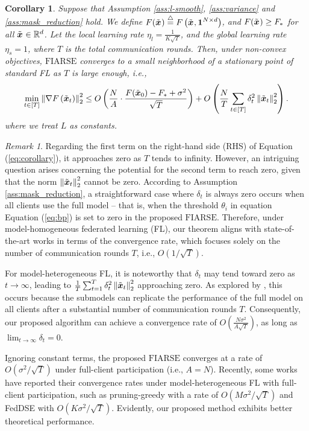 \documentclass{article}
\renewcommand{\cite}{\citep}
\theoremstyle{plain}
\newtheorem{corollary}[theorem]{Corollary}
\theoremstyle{definition}
\theoremstyle{remark}
\newtheorem{remark}[theorem]{Remark}
\newcommand{\algo}{\ensuremath{\text{FIARSE}}\xspace}
\renewcommand{\eqref}[1]{Equation (\ref{#1})}
\newcommand{\defeq}{\overset{\triangle}{=}}
\newcommand{\bracket}[1]{\left(#1\right)}
\newcommand{\norm}[1]{\left\|#1\right\|_2^2}
\begin{document}
\begin{corollary} \label{theorem}
Suppose that Assumption \ref{ass:l-smooth}, \ref{ass:variance} and \ref{ass:mask_reduction} hold. We define $F(\x{}) \defeq F\bracket{\x{}, \boldsymbol{1}^{N \times d}}$, and $F(\x{}) \geq F_*$ for all $\x{} \in \mathbb{R}^d$. Let the local learning rate $\eta_l = \frac{1}{K\sqrt{T}}$, and the global learning rate $\eta_s =1$, where $T$ is the total communication rounds. Then, under non-convex objectives, \algo converges to a small neighborhood of a stationary point of standard FL as $T$ is large enough, i.e., 
\begin{align} \label{eq:corollary}
    \min_{t \in [T]} \norm{\nabla F\bracket{\x{t}}} \leq  O\bracket{\frac{N}{A} \cdot \frac{F(\x{0}) - F_* + \sigma^2}{ \sqrt{T}}} + O\bracket{\frac{N}{T} \sum_{t \in [T]} \delta_t^2 \norm{\x{t}}}. 
\end{align}
where we treat $L$ as constants. 
\end{corollary}

\begin{remark}

Regarding the first term on the right-hand side (RHS) of \eqref{eq:corollary}, it approaches zero as $T$ tends to infinity. However, an intriguing question arises concerning the potential for the second term to reach zero, given that the norm $\norm{\x{t}}$ cannot be zero. According to Assumption \ref{ass:mask_reduction}, a straightforward case where $\delta_t$ is always zero occurs when all clients use the full model -- that is, when the threshold $\theta_i$ in equation \eqref{eq:bp} is set to zero in the proposed \algo. Therefore, under model-homogeneous federated learning (FL), our theorem aligns with state-of-the-art works \cite{karimireddy2020scaffold, yang2020achieving} in terms of the convergence rate, which focuses solely on the number of communication rounds $T$, i.e., $O\bracket{1/\sqrt{T}}$.

For model-heterogeneous FL, it is noteworthy that $\delta_t$ may tend toward zero as $t \rightarrow \infty$, leading to $\frac{1}{T} \sum_{t=1}^{T} \delta_t^2 \norm{\x{t}}$ approaching zero. As explored by \cite{zhou2023every, ma2021effective, wang2023theoretical}, this occurs because the submodels can replicate the performance of the full model on all clients after a substantial number of communication rounds $T$. Consequently, our proposed algorithm can achieve a convergence rate of $O\bracket{\frac{N\sigma^2}{A\sqrt{T}}}$, as long as $\lim_{t \rightarrow \infty} \delta_t = 0$.

Ignoring constant terms, the proposed \algo converges at a rate of $O\bracket{\sigma^2/\sqrt{T}}$ under full-client participation (i.e., $A = N$). Recently, some works have reported their convergence rates under model-heterogeneous FL with full-client participation, such as pruning-greedy \cite{zhou2023every} with a rate of $O\left(M\sigma^2/\sqrt{T}\right)$ and FedDSE \cite{wang2024feddse} with $O\left(K\sigma^2/\sqrt{T}\right)$. Evidently, our proposed method exhibits better theoretical performance. 

\end{remark}
\end{document}

